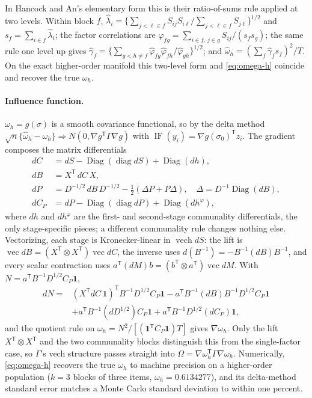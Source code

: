 \documentclass[11pt]{article}
\newcommand{\T}{^{\mathsf T}}
\newcommand{\IF}{\operatorname{IF}}
\theoremstyle{plain}
\theoremstyle{remark}
\begin{document}
In Hancock and An's \cite{hancockan2020} elementary form this is their
ratio-of-sums rule applied at two levels. Within block \(f\),
\(\hat\lambda_i=\{\sum_{j<\ell\in f}S_{ij}S_{i\ell}/\sum_{j<\ell\in f}S_{j\ell}\}^{1/2}\)
and \(s_f=\sum_{i\in f}\hat\lambda_i\); the factor correlations are
\(\hat\varphi_{fg}=\sum_{i\in f,\,j\in g}S_{ij}/(s_fs_g)\); the same rule one level
up gives
\(\hat\gamma_f=\{\sum_{g<h\ne f}\hat\varphi_{fg}\hat\varphi_{fh}/\hat\varphi_{gh}\}^{1/2}\);
and \(\hat\omega_h=(\sum_f\hat\gamma_fs_f)^2/T\). On the exact higher-order
manifold this two-level form and \eqref{eq:omega-h} coincide and recover the true
\(\omega_h\).

\paragraph{Influence function.} \(\omega_h=g(\sigma)\) is a smooth covariance
functional, so by the delta method
\(\sqrt n\{\hat\omega_h-\omega_h\}\Rightarrow N(0,\nabla g\T\Gamma\nabla g)\) with
\(\IF(y_i)=\nabla g(\sigma_0)\T z_i\). The gradient composes the matrix
differentials
\[
\begin{aligned}
  dC &= dS-\operatorname{Diag}(\operatorname{diag}dS)+\operatorname{Diag}(dh),\\
  dB &= X\T\,dC\,X,\\
  dP &= D^{-1/2}\,dB\,D^{-1/2}-\tfrac12(\Delta P+P\Delta),
        \quad \Delta=D^{-1}\operatorname{Diag}(dB),\\
  dC_P &= dP-\operatorname{Diag}(\operatorname{diag}dP)+\operatorname{Diag}(dh^\varphi),
\end{aligned}
\]
where \(dh\) and \(dh^\varphi\) are the first- and second-stage communality
differentials, the only stage-specific pieces; a different communality rule
changes nothing else. Vectorizing, each stage is Kronecker-linear in
\(\operatorname{vech}dS\): the lift is \(\operatorname{vec}dB=(X\T\otimes
X\T)\operatorname{vec}dC\), the inverse uses \(d(B^{-1})=-B^{-1}(dB)B^{-1}\), and
every scalar contraction uses \(a\T(dM)b=(b\T\otimes a\T)\operatorname{vec}dM\).
With \(N=a\T B^{-1}D^{1/2}C_P\mathbf 1\),
\[
\begin{aligned}
  dN ={}& (X\T dC\,\mathbf 1)\T B^{-1}D^{1/2}C_P\mathbf 1
     - a\T B^{-1}(dB)B^{-1}D^{1/2}C_P\mathbf 1 \\
     &+ a\T B^{-1}(dD^{1/2})C_P\mathbf 1
     + a\T B^{-1}D^{1/2}(dC_P)\mathbf 1,
\end{aligned}
\]
and the quotient rule on \(\omega_h=N^2/[(\mathbf 1\T C_P\mathbf 1)T]\) gives
\(\nabla\omega_h\). Only the lift \(X\T\otimes X\T\) and the two communality blocks
distinguish this from the single-factor case, so \(\Gamma\)'s vech structure
passes straight into \(\Omega=\nabla\omega_h\T\Gamma\nabla\omega_h\). Numerically,
\eqref{eq:omega-h} recovers the true \(\omega_h\) to machine precision on a
higher-order population (\(k=3\) blocks of three items, \(\omega_h=0.6134277\)),
and its delta-method standard error matches a Monte Carlo standard deviation to
within one percent.
\end{document}
